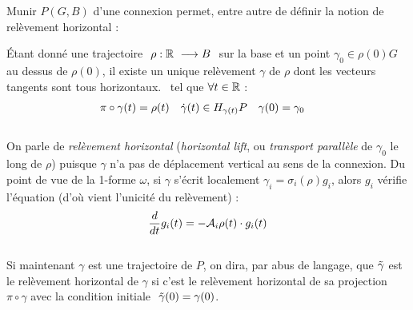 Munir $P(G,B)$ d'une connexion permet, entre autre de définir la notion de relèvement horizontal :
\begin{definition}
	Étant donné une trajectoire $\ \rho : \R\ \lr B\ $ sur la base et un point $\gamma_0\in \rho(0)G$ au dessus de $\rho(0)$, il existe un unique relèvement $\gamma$ de $\rho$ dont les vecteurs tangents sont tous horizontaux. \ie~tel que $\forall t\in\R$ :
	\begin{align} \label{eq:condi2hori_lift}
	\pi\circ\gamma(t) &= \rho(t)  &  \dot{\gamma}(t) &\in \hg[\gamma(t)]{P} &  \gamma(0) &= \gamma_0
	\end{align}
	\\
	On parle de \emph{relèvement horizontal} (\emph{horizontal lift}, ou \emph{transport parallèle} de $\gamma_0$ le long de $\rho$) puisque $\gamma$ n'a pas de déplacement vertical au sens de la connexion. Du point de vue de la 1-forme $\omega$, si $\gamma$ s'écrit localement $\gamma_i = \sigma_i(\rho) g_i$, alors $g_i$ vérifie l'équation (d'où vient l'unicité du relèvement) :
	\begin{equation} \label{eq:EDP2hori_lift}
		\frac{d}{dt}g_i(t)  = - \locconn_i\rho(t) \cdot g_i(t)
	\end{equation}
	\\
	Si maintenant $\gamma$ est une trajectoire de $P$, on dira, par abus de langage, que $\Tilde{\gamma}$ est le relèvement horizontal de $\gamma$ si c'est le relèvement horizontal de sa projection $\pi\circ\gamma$ avec la condition initiale $\ \Tilde{\gamma}(0) = \gamma(0)$.
\end{definition}
\skipl

